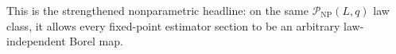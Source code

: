 This is the strengthened nonparametric headline: on the same \(\mathcal P_{\mathrm{NP}}(L,q)\) law class, it allows every fixed-point estimator section to be an arbitrary law-independent Borel map.